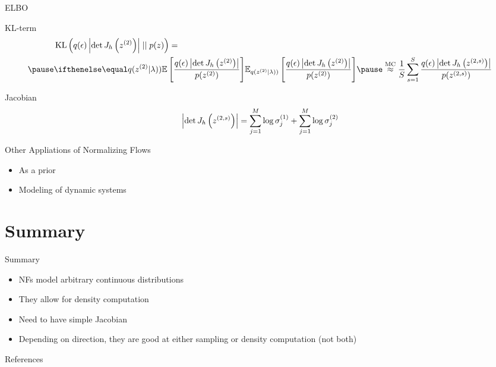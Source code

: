 \documentclass[14pt]{beamer}
\begin{document}
\begin{frame}{ELBO}
\begin{small}
\begin{block}{KL-term}
\begin{equation*}
\begin{aligned}
&\KL{q(\epsilon)\djac{h}{z^{(2)}}}{p(z)} = \\ \pause
&\E[q(z^{(2)}|\lambda))]{\frac{q(\epsilon)\djac{h}{z^{(2)}}}{p(z^{(2)})}} \pause \overset{\text{MC}}{\approx} \frac{1}{S}\sum_{s=1}^{S} \frac{q(\epsilon)\djac{h}{z^{(2,s)}}}{p(z^{(2,s)})}
\end{aligned}
\end{equation*}
\end{block}
\pause
\begin{block}{Jacobian}
\pause
\begin{equation*}
\left|\det J_{h}\left(z^{(2,s)}\right)\right| = \sum_{j=1}^{M}\log\sigma^{(1)}_{j} + \sum_{j=1}^{M}\log\sigma^{(2)}_{j}
\end{equation*}
\end{block}
\end{small}
\end{frame}

\begin{frame}{Other Appliations of Normalizing Flows}
\begin{itemize}
\item As a prior
\pause
\item Modeling of dynamic systems
\end{itemize}
\end{frame}

\section{Summary}

\begin{frame}{Summary}
\begin{itemize}
\item NFs model arbitrary continuous distributions
\item They allow for density computation
\item Need to have simple Jacobian
\item Depending on direction, they are good at either sampling or density computation (not both)
\end{itemize}
\end{frame}

\begin{frame}[allowframebreaks]{References}


\nocite{KingmaEtAl:2016, RezendeMohamed:2015, HuangEtAl:2018}
\end{frame}
\end{document}
